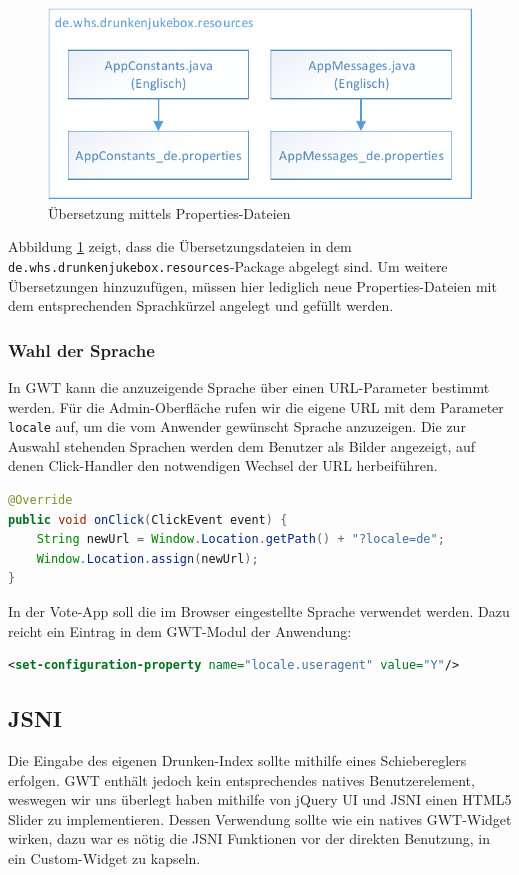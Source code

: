 \begin{figure}[tbh]
\centering
\includegraphics[width=0.7\linewidth]{Bilder/Lokalisierung}
\caption{Übersetzung mittels Properties-Dateien}
\label{fig:Lokalisierung}
\end{figure}

Abbildung \ref{fig:Lokalisierung} zeigt, dass die Übersetzungsdateien in dem
\texttt{de.whs.drunkenjukebox.resources}-Package abgelegt sind. Um weitere
Übersetzungen hinzuzufügen, müssen hier lediglich neue Properties-Dateien mit
dem entsprechenden Sprachkürzel angelegt und gefüllt werden.


\subsubsection{Wahl der Sprache}
In GWT kann die anzuzeigende Sprache über einen URL-Parameter bestimmt werden. Für die Admin-Oberfläche rufen wir die eigene URL
mit dem Parameter \texttt{locale} auf, um die vom Anwender
gewünscht Sprache anzuzeigen. Die zur Auswahl stehenden Sprachen werden dem Benutzer als Bilder angezeigt, auf denen Click-Handler den notwendigen Wechsel der URL herbeiführen.
\begin{lstlisting}[language=Java]
@Override
public void onClick(ClickEvent event) {
	String newUrl = Window.Location.getPath() + "?locale=de";
	Window.Location.assign(newUrl);
}
\end{lstlisting}
In der Vote-App soll die im Browser eingestellte Sprache verwendet werden. Dazu reicht ein Eintrag in dem GWT-Modul
der Anwendung:
\begin{lstlisting}[language=XML]
<set-configuration-property name="locale.useragent" value="Y"/>
\end{lstlisting}

\subsection{JSNI}
Die Eingabe des eigenen Drunken-Index sollte mithilfe eines Schiebereglers erfolgen. GWT enthält jedoch kein entsprechendes natives Benutzerelement, weswegen wir uns überlegt haben mithilfe von jQuery UI und JSNI einen HTML5 Slider zu implementieren. Dessen Verwendung sollte wie ein natives GWT-Widget wirken, dazu war es nötig die JSNI Funktionen vor der direkten Benutzung, in ein Custom-Widget zu kapseln. 

